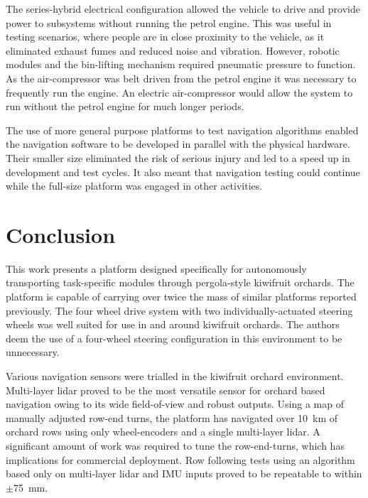 \documentclass[preprint,authoryear,12pt]{elsarticle}
\begin{document}
    The series-hybrid electrical configuration allowed the vehicle to drive and provide power to subsystems without running the petrol engine.
    This was useful in testing scenarios, where people are in close proximity to the vehicle, as it eliminated exhaust fumes and reduced noise and vibration.
    However, robotic modules and the bin-lifting mechanism required pneumatic pressure to function.
    As the air-compressor was belt driven from the petrol engine it was necessary to frequently run the engine.
    An electric air-compressor would allow the system to run without the petrol engine for much longer periods.

    The use of more general purpose platforms to test navigation algorithms enabled the navigation software to be developed in parallel with the physical hardware.
    Their smaller size eliminated the risk of serious injury and led to a speed up in development and test cycles.
    It also meant that navigation testing could continue while the full-size platform was engaged in other activities.


\section{Conclusion}
    This work presents a platform designed specifically for autonomously transporting task-specific modules through pergola-style kiwifruit orchards.
    The platform is capable of carrying over twice the mass of similar platforms reported previously.
    The four wheel drive system with two individually-actuated steering wheels was well suited for use in and around kiwifruit orchards.
    The authors deem the use of a four-wheel steering configuration in this environment to be unnecessary.

    Various navigation sensors were trialled in the kiwifruit orchard environment.
    Multi-layer lidar proved to be the most versatile sensor for orchard based navigation owing to its wide field-of-view and robust outputs.
    Using a map of manually adjusted row-end turns, the platform has navigated over \SI{10}{\kilo\meter} of orchard rows using only wheel-encoders and a single multi-layer lidar.
    A significant amount of work was required to tune the row-end-turns, which has implications for commercial deployment.
    Row following tests using an algorithm based only on multi-layer lidar and IMU inputs proved to be repeatable to within $\pm$\SI{75}{\milli\meter}.
\end{document}
